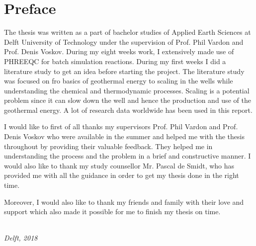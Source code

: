 \chapter*{Preface}
The thesis was written as a part of bachelor studies of Applied Earth Sciences at Delft University of Technology under the supervision of Prof. Phil Vardon and Prof. Denis Voskov. During my eight weeks work, I extensively made use of PHREEQC for batch simulation reactions. During my first weeks I did a literature study to get an idea before starting the project. The literature study was focused on fro basics of geothermal energy to scaling in the wells while understanding the chemical and thermodynamic processes. Scaling is a potential problem since it can slow down the well and hence the production and use of the geothermal energy. A lot of research data worldwide has been used in this report. 
\newline

    I would like to first of all thanks my supervisors Prof. Phil Vardon and Prof. Denis Voskov who were available in the summer and helped me with the thesis throughout by providing their valuable feedback. They helped me in understanding the process and the problem in a brief and constructive manner. I would also like to thank my study counsellor Mr. Pascal de Smidt, who has provided me with all the guidance in order to get my thesis done in the right time. 
    \newline
    
Moreover, I would also like to thank my friends and family with their love and support which also made it possible for me to finish my thesis on time. 
\begin{flushright}
{\makeatletter\itshape
    \@author \\
    Delft,  2018
\makeatother}
\end{flushright}

